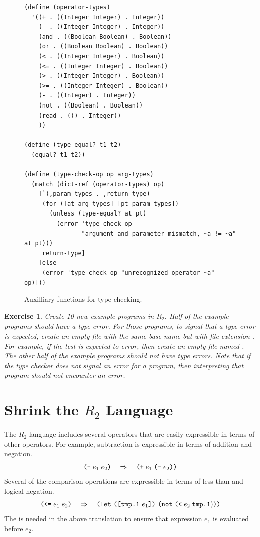 \documentclass[11pt]{book}
\newtheorem{exercise}[theorem]{Exercise}
\begin{document}
\begin{figure}[tbp]
\begin{lstlisting}
(define (operator-types)
  '((+ . ((Integer Integer) . Integer))
    (- . ((Integer Integer) . Integer))
    (and . ((Boolean Boolean) . Boolean))
    (or . ((Boolean Boolean) . Boolean))
    (< . ((Integer Integer) . Boolean))
    (<= . ((Integer Integer) . Boolean))
    (> . ((Integer Integer) . Boolean))
    (>= . ((Integer Integer) . Boolean))
    (- . ((Integer) . Integer))
    (not . ((Boolean) . Boolean))
    (read . (() . Integer))
    ))

(define (type-equal? t1 t2)
  (equal? t1 t2))

(define (type-check-op op arg-types)
  (match (dict-ref (operator-types) op)
    [`(,param-types . ,return-type)
     (for ([at arg-types] [pt param-types]) 
       (unless (type-equal? at pt)
         (error 'type-check-op
                "argument and parameter mismatch, ~a != ~a" at pt)))
     return-type]
    [else
     (error 'type-check-op "unrecognized operator ~a" op)]))
\end{lstlisting}
\caption{Auxilliary functions for type checking.}
\label{fig:type-check-aux-R2}
\end{figure}



\begin{exercise}\normalfont
Create 10 new example programs in $R_2$. Half of the example programs
should have a type error. For those programs, to signal that a type
error is expected, create an empty file with the same base name but
with file extension . For example, if the test
 is expected to error, then create an empty file
named .  The other half of the example programs
should not have type errors. Note that if the type checker does not
signal an error for a program, then interpreting that program should
not encounter an error.
\end{exercise}


\section{Shrink the $R_2$ Language}
\label{sec:shrink-r2}

The $R_2$ language includes several operators that are easily
expressible in terms of other operators. For example, subtraction is
expressible in terms of addition and negation.
\[
 \texttt{(-}\; e_1 \; e_2\texttt{)} \quad \Rightarrow \quad \texttt{(}\texttt{+} \; e_1 \; \texttt{(}\texttt{-} \; e_2\texttt{)}\texttt{)}
\]
Several of the comparison operations are expressible in terms of
less-than and logical negation.
\[
\texttt{(}\texttt{<=}\; e_1 \; e_2\texttt{)} \quad \Rightarrow \quad
\texttt{(}\texttt{let}~\texttt{(}\texttt{[}\texttt{tmp.1}~e_1\texttt{]}\texttt{)}~\texttt{(}\texttt{not}\;\texttt{(}\texttt{<}\;e_2\;\texttt{tmp.1})\texttt{)}\texttt{)}
\]
The  is needed in the above translation to ensure that
expression $e_1$ is evaluated before $e_2$.
\end{document}
